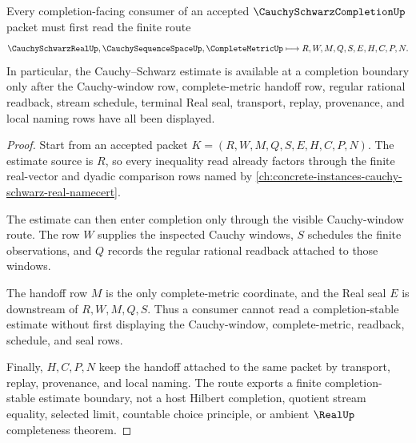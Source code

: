 \begin{theorem}
\label{thm:cauchy-schwarz-completion-limit-handoff}
Every completion-facing consumer of an accepted $\CauchySchwarzCompletionUp$ packet must first read the finite route
$$
\CauchySchwarzRealUp,\CauchySequenceSpaceUp,\CompleteMetricUp
\longmapsto
R,W,M,Q,S,E,H,C,P,N .
$$
In particular, the Cauchy--Schwarz estimate is available at a completion boundary only after the Cauchy-window row, complete-metric handoff row, regular rational readback, stream schedule, terminal Real seal, transport, replay, provenance, and local naming rows have all been displayed.
\end{theorem}
\begin{proof}
Start from an accepted packet $K=(R,W,M,Q,S,E,H,C,P,N)$. The estimate source is $R$, so every inequality read already factors through the finite real-vector and dyadic comparison rows named by \autoref{ch:concrete-instances-cauchy-schwarz-real-namecert}.

The estimate can then enter completion only through the visible Cauchy-window route. The row $W$ supplies the inspected Cauchy windows, $S$ schedules the finite observations, and $Q$ records the regular rational readback attached to those windows.

The handoff row $M$ is the only complete-metric coordinate, and the Real seal $E$ is downstream of $R,W,M,Q,S$. Thus a consumer cannot read a completion-stable estimate without first displaying the Cauchy-window, complete-metric, readback, schedule, and seal rows.

Finally, $H,C,P,N$ keep the handoff attached to the same packet by transport, replay, provenance, and local naming. The route exports a finite completion-stable estimate boundary, not a host Hilbert completion, quotient stream equality, selected limit, countable choice principle, or ambient $\RealUp$ completeness theorem.
\end{proof}



